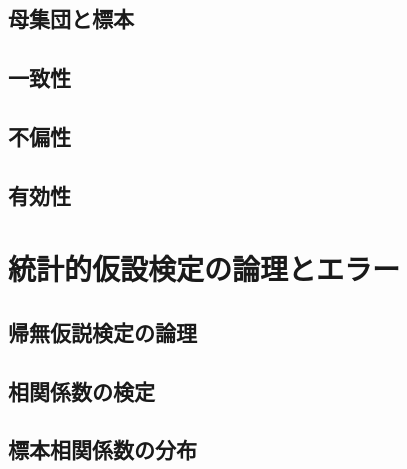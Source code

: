 \documentclass[
  a4paper,
]{ltjsbook}
\begin{document}
\hypertarget{ux6bcdux96c6ux56e3ux3068ux6a19ux672c}{%
\section{母集団と標本}\label{ux6bcdux96c6ux56e3ux3068ux6a19ux672c}}

\hypertarget{ux4e00ux81f4ux6027}{%
\section{一致性}\label{ux4e00ux81f4ux6027}}

\hypertarget{ux4e0dux504fux6027}{%
\section{不偏性}\label{ux4e0dux504fux6027}}

\hypertarget{ux6709ux52b9ux6027}{%
\section{有効性}\label{ux6709ux52b9ux6027}}


\hypertarget{ux7d71ux8a08ux7684ux4eeeux8a2dux691cux5b9aux306eux8ad6ux7406ux3068ux30a8ux30e9ux30fc}{%
\chapter{統計的仮設検定の論理とエラー}\label{ux7d71ux8a08ux7684ux4eeeux8a2dux691cux5b9aux306eux8ad6ux7406ux3068ux30a8ux30e9ux30fc}}

\hypertarget{ux5e30ux7121ux4eeeux8aacux691cux5b9aux306eux8ad6ux7406}{%
\section{帰無仮説検定の論理}\label{ux5e30ux7121ux4eeeux8aacux691cux5b9aux306eux8ad6ux7406}}

\hypertarget{ux76f8ux95a2ux4fc2ux6570ux306eux691cux5b9a}{%
\section{相関係数の検定}\label{ux76f8ux95a2ux4fc2ux6570ux306eux691cux5b9a}}

\hypertarget{ux6a19ux672cux76f8ux95a2ux4fc2ux6570ux306eux5206ux5e03}{%
\section{標本相関係数の分布}\label{ux6a19ux672cux76f8ux95a2ux4fc2ux6570ux306eux5206ux5e03}}
\end{document}
